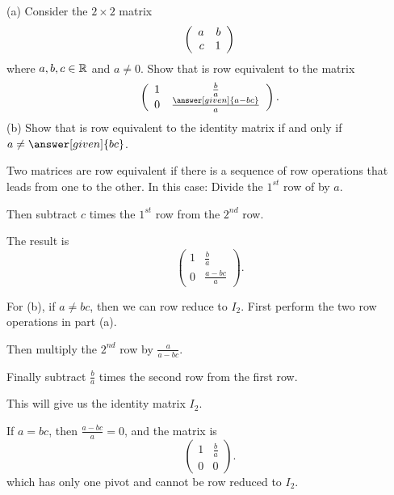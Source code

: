 \documentclass{ximera}
\begin{document}
\begin{exercise} \label{c2.3.8}
(a) Consider the $2\times 2$ matrix
\begin{equation}  \label{e:2x2}
\left(\begin{array}{rr} a & b\\ c &1\end{array}\right)
\end{equation}
where $a,b,c\in\mbox{$\Bbb{R}$}$ and $a\neq 0$.  Show that 
is row equivalent to the matrix
\[
\left(\begin{array}{cc} 1 & \frac{b}{a} \\ 0 & \frac{\answer[given]{a-bc}}{a}
\end{array} \right).
\]
(b)  Show that  is row equivalent to the
identity matrix if and only if $a\neq \answer[given]{bc}$.

\begin{hint}
Two matrices are row equivalent if there is a sequence of row operations
that leads from one to the other.  In this case: Divide the $1^{st}$ row of  by $a$.
\end{hint}
\begin{hint}
Then subtract $c$ times the $1^{st}$ row from the $2^{nd}$ row.
\end{hint}
\begin{hint}
The result is
\[
\left(\begin{array}{cc} 1 & \frac{b}{a} \\ 0 & \frac{a - bc}{a}\end{array}
\right).
\]
\end{hint}
\begin{hint}
For (b), if $a \neq bc$, then we can row reduce  to $I_2$.  First
perform the two row operations in part (a).
\end{hint}
\begin{hint}
  Then multiply the $2^{nd}$ row by $\frac{a}{a - bc}$.
\end{hint}
\begin{hint}
  Finally subtract $\frac{b}{a}$ times the second row from the first row.
\end{hint}
\begin{hint}
This will give us the identity matrix $I_2$.
\end{hint}
\begin{hint}
  If $a = bc$, then $\frac{a - bc}{a} = 0$, and the matrix is
\[
\left(\begin{array}{cc} 1 & \frac{b}{a} \\ 0 & 0\end{array} \right).
\]
which has only one pivot and cannot be row reduced to $I_2$.
\end{hint}
\end{exercise}
\end{document}
